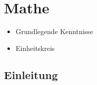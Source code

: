\section{Mathe}
    \begin{itemize}
        \item {Grundlegende Kenntnisse}
        \item{Einheitskreis}
    \end{itemize}
    
    \subsection{Einleitung}
    
    
\newpage